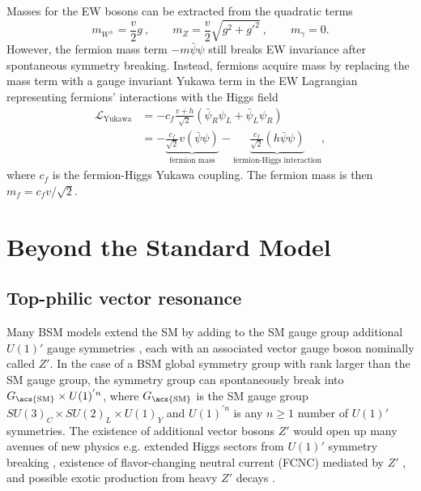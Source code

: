 \documentclass[../thesis.tex]{subfiles}
\begin{document}
Masses for the \acs{EW} bosons can be extracted from the quadratic terms
\begin{equation}
m_{W^\pm} = \frac{v}{2}g\:, \qquad m_Z = \frac{v}{2}\sqrt{g^2+g'^2}\:, \qquad m_\gamma = 0.
\end{equation}
However, the fermion mass term $-m\bar{\psi}\psi$ still breaks \acs{EW} invariance after spontaneous symmetry breaking. Instead, fermions acquire mass by replacing the mass term with a gauge invariant Yukawa term in the \acs{EW} Lagrangian representing fermions' interactions with the Higgs field \citep{theory:higgs_physics}
\begin{equation}
\begin{aligned}
\mathcal{L}_\text{Yukawa} 
&= -c_f\frac{v+h}{\sqrt{2}}\left(\bar{\psi}_R\psi_L+\bar{\psi}_L\psi_R\right) \\
&=
- \underbrace{\frac{c_f}{\sqrt{2}}v(\bar{\psi}\psi)}_\text{fermion mass}
- \underbrace{\frac{c_f}{\sqrt{2}}(h\bar{\psi}\psi)}_\text{fermion-Higgs interaction},
\end{aligned}
\end{equation}
where $c_f$ is the fermion-Higgs Yukawa coupling. The fermion mass is then $m_f = c_f v/\sqrt{2}$.

\section{Beyond the Standard Model}
\subsection{Top-philic vector resonance}
\label{sec:ttZp}
Many BSM models extend the \acs{SM} by adding to the \acs{SM} gauge group additional $U(1)'$ gauge symmetries \citep{theory:Zp_U1p}, each with an associated vector gauge boson nominally called $Z'$. In the case of a \acs{BSM} global symmetry group with rank larger than the \acs{SM} gauge group, the symmetry group can spontaneously break into $G_\text{\acs{SM}}\times U(1)^{'n}$, where $G_\text{\acs{SM}}$ is the \acs{SM} gauge group $SU(3)_C \times SU(2)_L \times U(1)_Y$ and $U(1)^{'n}$ is any $n\geq 1$ number of $U(1)'$ symmetries. The existence of additional vector bosons $Z'$ would open up many avenues of new physics e.g. extended Higgs sectors from $U(1)'$ symmetry breaking \citep{theory:little_higgs,theory:little_higgs2}, existence of flavor-changing neutral current (FCNC) mediated by $Z'$ \citep{theory:fcnc}, and possible exotic production from heavy $Z'$ decays \citep{theory:Zp}.
\end{document}
